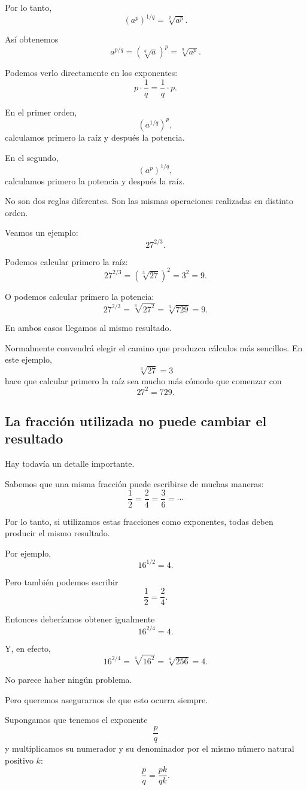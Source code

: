 Por lo tanto,
\[
\left(a^p\right)^{1/q}
=
\sqrt[q]{a^p}.
\]

Así obtenemos
\[
\boxed{
a^{p/q}
=
\left(\sqrt[q]{a}\right)^p
=
\sqrt[q]{a^p}
}.
\]

Podemos verlo directamente en los exponentes:
\[
p\cdot\frac1q
=
\frac1q\cdot p.
\]

En el primer orden,
\[
\left(a^{1/q}\right)^p,
\]
calculamos primero la raíz y después la potencia.

En el segundo,
\[
\left(a^p\right)^{1/q},
\]
calculamos primero la potencia y después la raíz.

No son dos reglas diferentes. Son las mismas operaciones realizadas en distinto orden.

Veamos un ejemplo:
\[
27^{2/3}.
\]

Podemos calcular primero la raíz:
\[
27^{2/3}
=
\left(\sqrt[3]{27}\right)^2
=
3^2
=
9.
\]

O podemos calcular primero la potencia:
\[
27^{2/3}
=
\sqrt[3]{27^2}
=
\sqrt[3]{729}
=
9.
\]

En ambos casos llegamos al mismo resultado.

Normalmente convendrá elegir el camino que produzca cálculos más sencillos. En este ejemplo,
\[
\sqrt[3]{27}=3
\]
hace que calcular primero la raíz sea mucho más cómodo que comenzar con
\[
27^2=729.
\]

\subsection{La fracción utilizada no puede cambiar el resultado}

Hay todavía un detalle importante.

Sabemos que una misma fracción puede escribirse de muchas maneras:
\[
\frac12=\frac24=\frac36=\cdots
\]

Por lo tanto, si utilizamos estas fracciones como exponentes, todas deben producir el mismo resultado.

Por ejemplo,
\[
16^{1/2}=4.
\]

Pero también podemos escribir
\[
\frac12=\frac24.
\]

Entonces deberíamos obtener igualmente
\[
16^{2/4}=4.
\]

Y, en efecto,
\[
16^{2/4}
=
\sqrt[4]{16^2}
=
\sqrt[4]{256}
=
4.
\]

No parece haber ningún problema.

Pero queremos asegurarnos de que esto ocurra siempre.

Supongamos que tenemos el exponente
\[
\frac pq
\]
y multiplicamos su numerador y su denominador por el mismo número natural positivo \(k\):
\[
\frac pq=\frac{pk}{qk}.
\]

